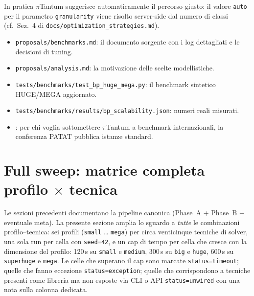 In pratica $\pi$Tantum suggerisce automaticamente il
percorso giusto: il valore \texttt{auto} per il parametro
\texttt{granularity} viene risolto server-side dal numero
di classi (cf.\ Sez.~4 di
\texttt{docs/optimization\_strategies.md}).

\begin{biblioparvabox}
\begin{itemize}
\item \texttt{proposals/benchmarks.md}: il documento sorgente
  con i log dettagliati e le decisioni di tuning.
\item \texttt{proposals/analysis.md}: la motivazione delle
  scelte modellistiche.
\item \texttt{tests/benchmarks/test\_bp\_huge\_mega.py}: il
  benchmark sintetico HUGE/MEGA aggiornato.
\item \texttt{tests/benchmarks/results/bp\_scalability.json}:
  numeri reali misurati.
\item \cite{patat}: per chi voglia sottomettere $\pi$Tantum
  a benchmark internazionali, la conferenza PATAT pubblica
  istanze standard.
\end{itemize}
\end{biblioparvabox}

\section{Full sweep: matrice completa profilo $\times$ tecnica}
\label{sec:bench-full-sweep}


Le sezioni precedenti documentano la pipeline canonica
(Phase~A + Phase~B + eventuale meta). La presente sezione
amplia lo sguardo a \emph{tutte} le combinazioni
profilo--tecnica: sei profili (\texttt{small} \dots
\texttt{mega}) per circa venticinque tecniche di solver,
una sola run per cella con \texttt{seed=42}, e un cap
di tempo per cella che cresce con la dimensione del
profilo: 120\,s su \texttt{small} e \texttt{medium},
300\,s su \texttt{big} e \texttt{huge}, 600\,s su
\texttt{superhuge} e \texttt{mega}. Le celle che superano
il cap sono marcate \texttt{status=timeout}; quelle che
fanno eccezione \texttt{status=exception}; quelle che
corrispondono a tecniche presenti come libreria ma non
esposte via CLI o API \texttt{status=unwired} con una nota
sulla colonna dedicata.

